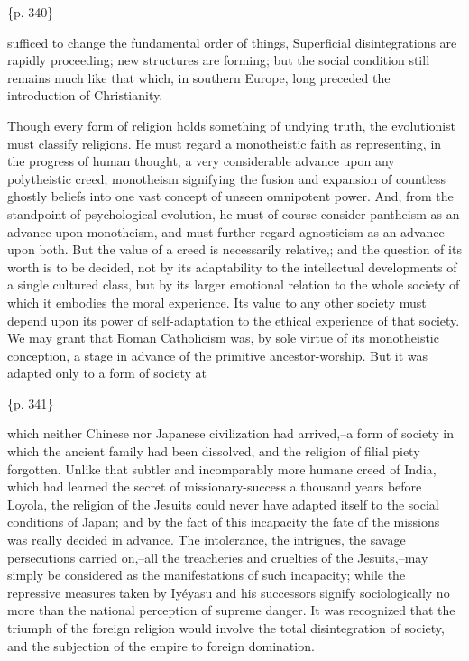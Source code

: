 \{p. 340\}

sufficed to change the fundamental order of things, Superficial disintegrations are rapidly proceeding; new structures are forming; but the social condition still remains much like that which, in southern Europe, long preceded the introduction of Christianity.



Though every form of religion holds something of undying truth, the evolutionist must classify religions. He must regard a monotheistic faith as representing, in the progress of human thought, a very considerable advance upon any polytheistic creed; monotheism signifying the fusion and expansion of countless ghostly beliefs into one vast concept of unseen omnipotent power. And, from the standpoint of psychological evolution, he must of course consider pantheism as an advance upon monotheism, and must further regard agnosticism as an advance upon both. But the value of a creed is necessarily relative,; and the question of its worth is to be decided, not by its adaptability to the intellectual developments of a single cultured class, but by its larger emotional relation to the whole society of which it embodies the moral experience. Its value to any other society must depend upon its power of self-adaptation to the ethical experience of that society. We may grant that Roman Catholicism was, by sole virtue of its monotheistic conception, a stage in advance of the primitive ancestor-worship. But it was adapted only to a form of society at

\{p. 341\}

which neither Chinese nor Japanese civilization had arrived,--a form of society in which the ancient family had been dissolved, and the religion of filial piety forgotten. Unlike that subtler and incomparably more humane creed of India, which had learned the secret of missionary-success a thousand years before Loyola, the religion of the Jesuits could never have adapted itself to the social conditions of Japan; and by the fact of this incapacity the fate of the missions was really decided in advance. The intolerance, the intrigues, the savage persecutions carried on,--all the treacheries and cruelties of the Jesuits,--may simply be considered as the manifestations of such incapacity; while the repressive measures taken by Iyéyasu and his successors signify sociologically no more than the national perception of supreme danger. It was recognized that the triumph of the foreign religion would involve the total disintegration of society, and the subjection of the empire to foreign domination.



